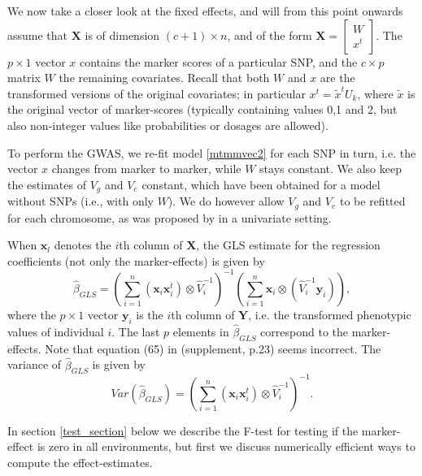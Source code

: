 \documentclass[12pt]{article}
\begin{document}
We now take a closer look at the fixed effects, and will from this point onwards assume that $\mathbf{X}$ is of dimension $(c+1) \times n$, and of the form $\mathbf{X} = \left[\begin{array}{c}
W \\ x^t
\end{array}\right]$. %
The $p \times 1$ vector $x$ contains the marker scores of a particular SNP, and the $c \times p$ matrix $W$ the remaining covariates.
Recall that both $W$ and $x$ are the transformed versions of the original covariates; in particular $x^t = \tilde x^t U_k$, where $\tilde x$ is the original vector of marker-scores (typically containing values 0,1 and 2, but also non-integer values like probabilities or dosages are allowed).

To perform the GWAS, we re-fit model \eqref{mtmmvec2} for each SNP in turn, i.e. the vector $x$ changes from marker to marker, while $W$ stays constant. We also keep the estimates of $V_g$ and $V_e$ constant, which have been obtained for a model without SNPs (i.e., with only $W$). We do however allow  $V_g$ and $V_e$ to be refitted for each chromosome, as was proposed by \cite{rincent_etal_2014} in a univariate setting.


When $\mathbf{x}_l$ denotes the $i$th column of $\mathbf{X}$, the GLS estimate for the regression coefficients (not only the marker-effects) is given by
\begin{equation} \label{gls1}
\hat \beta_{GLS} = \left(\sum_{i=1}^n (\mathbf{x}_i \mathbf{x}_i^t) \otimes \hat V_i^{-1} \right)^{-1}
\left( \sum_{i=1}^n \mathbf{x}_i \otimes (\hat V_i^{-1} \mathbf{y}_i)\right),
%
\end{equation}
where the $p \times 1$ vector $\mathbf{y}_i$ is the $i$th column of $\mathbf{Y}$, i.e. the transformed phenotypic values of individual $i$.
The last $p$ elements in $\hat \beta_{GLS}$ correspond to the marker-effects. Note that equation (65) in \cite{zhou_stephens_2014} (supplement, p.23) seems incorrect. The variance of $\hat \beta_{GLS}$ is given by
\begin{equation*}
Var (\hat \beta_{GLS}) = \left(\sum_{i=1}^n (\mathbf{x}_i \mathbf{x}_i^t) \otimes \hat V_i^{-1} \right)^{-1}.
\end{equation*}

%
In section \ref{test_section} below we describe the F-test for testing if the marker-effect is zero in all environments, but first we discuss numerically efficient ways to compute the effect-estimates.
\end{document}
